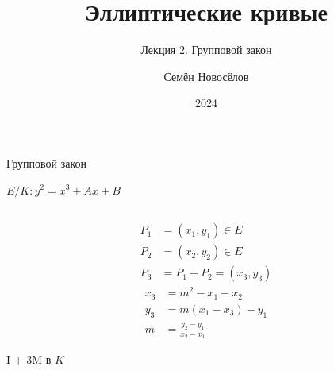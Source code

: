 \documentclass{beamer}
\title{Эллиптические кривые}
\subtitle{Лекция 2. Групповой закон}
\author{Семён Новосёлов}
\institute{БФУ им. И. Канта}
\date{2024}
\begin{document}
	
	\frame{\titlepage}
	
	\begin{frame}{Групповой закон}%
		\begin{center}
			$E/K: y^2 = x^3 + Ax + B$
		\end{center}
		\begin{columns}
			\begin{column}{0.5\textwidth}
				\begin{equation*}
					\begin{split}
						P_1 &= (x_1, y_1) \in E \\
						P_2 &= (x_2, y_2) \in E \\
						P_3 &= P_1 + P_2 = \left(x_3, y_3\right)
					\end{split}
				\end{equation*}
				\begin{equation*}
					\begin{split}
						x_3 &= m^2 - x_1 - x_2 \\
						y_3 &= m\left( x_1 - x_3 \right) - y_1 \\
						m &= \frac{y_2 - y_1}{x_2 - x_1}
					\end{split}
				\end{equation*}
				\begin{center}
					\begin{tcolorbox}[enhanced,hbox,colback=box-blue-color!15,colframe=box-blue-color,title=Сложность,center title]
						\begin{varwidth}{\textwidth}
							\begin{center}
								I + $3$M в $K$
							\end{center}
						\end{varwidth}
					\end{tcolorbox}	
				\end{center}
				

\end{column}
\end{columns}
\end{frame}
\end{document}
